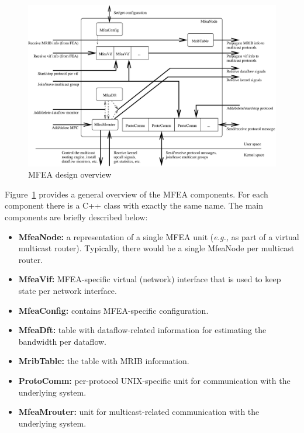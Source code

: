 \documentclass[11pt]{article}
\newcommand{\eg}{\emph{e.g.,}\xspace}
\begin{document}
\begin{figure}[htbp]
  \begin{center}
    \includegraphics[scale=0.5]{figs/mfea_design_overview}
    \caption{MFEA design overview}
    \label{fig:mfea_design_overview}
  \end{center}
\end{figure}

Figure~\ref{fig:mfea_design_overview} provides a general overview of the
MFEA components. For each component there is a C++ class with exactly
the same name. The main components are briefly described below:

\begin{itemize}

  \item {\bf MfeaNode:} a representation of a single MFEA unit
  (\eg as part of a virtual multicast router).
  Typically, there would be a single MfeaNode per multicast router.

  \item {\bf MfeaVif:} MFEA-specific virtual (network) interface that is used
  to keep state per network interface.

  \item {\bf MfeaConfig:} contains MFEA-specific configuration.

  \item {\bf MfeaDft:} table with dataflow-related information for
  estimating the bandwidth per dataflow.

  \item {\bf MribTable:} the table with MRIB information.

  \item {\bf ProtoComm:} per-protocol UNIX-specific unit for
  communication with the underlying system.

  \item {\bf MfeaMrouter:} unit for multicast-related communication with
  the underlying system.

\end{itemize}
\end{document}
